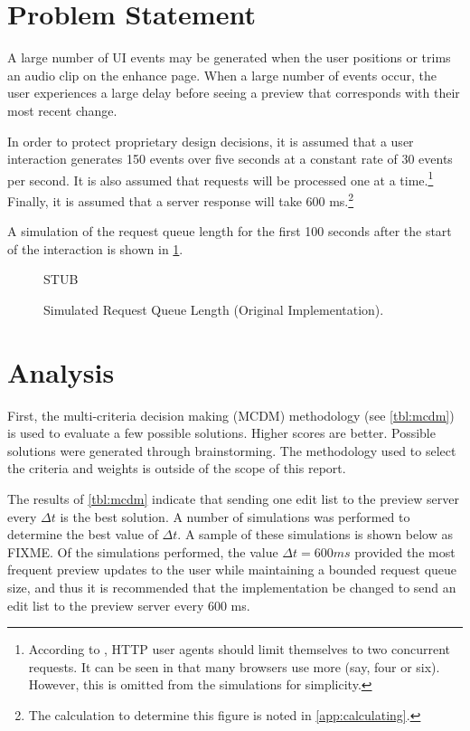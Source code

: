 \documentclass[se,resubmit]{uw-wkrpt}
\begin{document}
\section{Problem Statement}\label{sec:problem}
A large number of UI events may be generated when the user positions or trims an
audio clip on the enhance page. When a large number of events occur, the user
experiences a large delay before seeing a preview that corresponds with their
most recent change.

In order to protect proprietary design decisions, it is assumed that a user
interaction generates 150 events over five seconds at a constant rate of 30
events per second. It is also assumed that requests will be processed one at a
time.\footnote{According to \cite{ref:http}, HTTP user agents should limit
themselves to two concurrent requests. It can be seen in \cite{ref:b423377} that
many browsers use more (say, four or six). However, this is omitted from the
simulations for simplicity.} Finally, it is assumed that a server response will
take 600 ms.\footnote{The calculation to determine this figure is noted in
\ref{app:calculating}.}

A simulation of the request queue length for the first 100 seconds after the
start of the interaction is shown in \ref{fig:simulated}.

\begin{figure}
  \centering
  STUB
  \caption{Simulated Request Queue Length (Original Implementation).}
  \label{fig:simulated}
\end{figure}

\section{Analysis}

First, the multi-criteria decision making (MCDM) methodology (see
\ref{tbl:mcdm}) is used to evaluate a few possible solutions. Higher scores are
better. Possible solutions were generated through brainstorming.  The
methodology used to select the criteria and weights is outside of the scope of
this report.

The results of \ref{tbl:mcdm} indicate that sending one edit list to the
preview server every $\Delta t$ is the best solution. A number of simulations was
performed to determine the best value of $\Delta t$. A sample of these
simulations is shown below as FIXME. Of the simulations performed, the value
$\Delta t=600 ms$ provided the most frequent preview updates to the user while
maintaining a bounded request queue size, and thus it is recommended that the
implementation be changed to send an edit list to the preview server every 600
ms.
\end{document}
